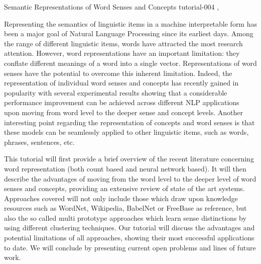 
\begin{tutorial}
  {Semantic Representations of Word Senses and Concepts}
  {tutorial-004}
  {\daydateyear, \tutorialmorningtime}
  {\TutLocD}

Representing the semantics of linguistic items in a machine ­interpretable form has been a major goal of Natural Language Processing since its earliest days. Among the range of different linguistic items, words have attracted the most research attention. However, word representations have an important limitation: they conflate different meanings of a word into a single vector. Representations of word senses have the potential to overcome this inherent limitation. Indeed, the representation of individual word senses and concepts has recently gained in popularity with several experimental results showing that a considerable performance improvement can be achieved across different NLP applications upon moving from word level to the deeper sense and concept levels. Another interesting point regarding the representation of concepts and word senses is that these models can be seamlessly applied to other linguistic items, such as words, phrases, sentences, etc.

This tutorial will first provide a brief overview of the recent literature concerning word representation (both count based and neural network based). It will then describe the advantages of moving from the word level to the deeper level of word senses and concepts, providing an extensive review of state ­of ­the ­art systems. Approaches covered will not only include those which draw upon knowledge resources such as WordNet, Wikipedia, BabelNet or FreeBase as reference, but also the so ­called multi ­prototype approaches which learn sense distinctions by using different clustering techniques. Our tutorial will discuss the advantages and potential limitations of all approaches, showing their most successful applications to date. We will conclude by presenting current open problems and lines of future work.
\end{tutorial}

